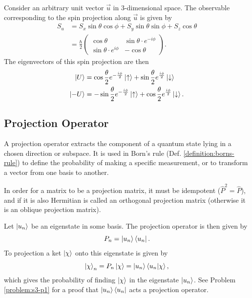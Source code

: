 \documentclass{article}
\begin{document}
Consider an arbitrary unit vector $\vec{u}$ in 3-dimensional space. The observable corresponding to the spin projection along $\vec{u}$ is given by
\begin{align*}
    S_u &= S_x\sin\theta \cos\phi +S_y\sin\theta \sin\phi +S_z\cos\theta  \\
        &=\frac{\hbar }{2}\begin{pmatrix}
            \cos\theta &\sin\theta \cdot e^{-i\phi } \\
            \sin\theta \cdot e^{i\phi} &-\cos\theta
        \end{pmatrix}.
\end{align*}
The eigenvectors of this spin projection are then
\begin{align*}
    \ket{U} &= \cos \frac{\theta }{2}e^{-\frac{i\phi }{2}}\ket{\uparrow}+\sin \frac{\theta }{2}e^{\frac{i\phi }{2}}\ket{\downarrow} \\
    \ket{-U} &=-\sin \frac{\theta }{2}e^{-\frac{i\phi }{2}}\ket{\uparrow}+\cos \frac{\theta }{2}e^{\frac{i\phi }{2}}\ket{\downarrow}.
\end{align*}

\subsection{Projection Operator} \label{section:projection-operator}
A projection operator extracts the component of a quantum state lying in a chosen direction or subspace. It is used in Born's rule (Def. \ref{definition:borns-rule}) to define the probability of making a specific measurement, or to transform a vector from one basis to another.

In order for a matrix to be a projection matrix, it must be idempotent ($\hat{P}^2=\hat{P}$), and if it is also Hermitian is called an orthogonal projection matrix (otherwise it is an oblique projection matrix).

Let $\ket{u_n}$ be an eigenstate in some basis. The projection operator is then given by
\[
    P_n=\ket{u_n}\bra{u_n}.
\]
To projection a ket $\ket{\chi }$ onto this eigenstate is given by
\[
    \ket{\chi }_n=P_n \ket{\chi }=\ket{u_n}\braket{u_n}{\chi },
\]
which gives the probability of finding $\ket{\chi }$ in the eigenstate $\ket{u_n}$. See Problem \ref{problem:s3-p1} for a proof that $\ket{u_n}\bra{u_n}$ acts a projection operator.
\end{document}
